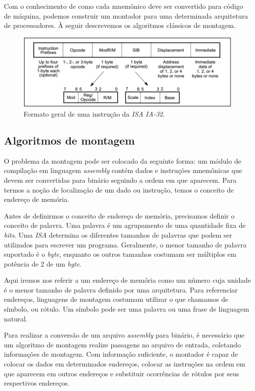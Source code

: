 Com o conhecimento de como cada mnemônico deve ser convertido para código de máquina, podemos construir um montador para uma determinada arquitetura de processadores. À seguir descrevemos os algoritmos clássicos de montagem.

\begin{figure}[ptb]
  \begin{center}
    \includegraphics[scale=.6]{imagens/instrucoes_ia32}
  \end{center}
  \caption{Formato geral de uma instrução da \textit{ISA} \textit{IA-32}.}
  \label{instrucoes_ia32}
\end{figure}

\subsection{Algoritmos de montagem}

O problema da montagem pode ser colocado da seguinte forma: um módulo de compilação em linguagem \textit{assembly} contém dados e instruções mnemônicas que devem ser convertidas para binário seguindo a ordem em que aparecem. Para termos a noção de localização de um dado ou instrução, temos o conceito de endereço de memória.

Antes de definirmos o conceito de endereço de memória, precisamos definir o conceito de palavra. Uma palavra é um agrupamento de uma quantidade fixa de \textit{bits}. Uma \textit{ISA} determina os diferentes tamanhos de palavras que podem ser utilizados para escrever um programa. Geralmente, o menor tamanho de palavra suportado é o \textit{byte}, enquanto os outros tamanhos costumam ser múltiplos em potência de 2 de um \textit{byte}.

Aqui iremos nos referir a um endereço de memória como um número cuja unidade é o menor tamanho de palavra definido por uma arquitetura. Para referenciar endereços, linguagens de montagem costumam utilizar o que chamamos de símbolo, ou rótulo. Um símbolo pode ser uma palavra ou uma frase de linguagem natural.

Para realizar a conversão de um arquivo \textit{assembly} para binário, é necessário que um algoritmo de montagem realize passagens no arquivo de entrada, coletando informações de montagem. Com informação suficiente, o montador é capaz de colocar os dados em determinados endereços, colocar as instruções na ordem em que aparecem em outros endereços e substituir ocorrências de rótulos por seus respectivos endereços.

